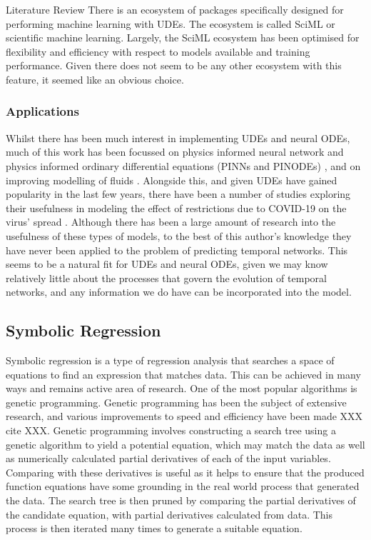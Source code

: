 \documentclass[12pt]{amsart}
\begin{document}
\begin{section}{Literature Review}
            There is an ecosystem of packages specifically designed for performing machine learning with UDEs. The ecosystem is called SciML or scientific machine learning\cite{SciML_C_Rak}. Largely, the SciML ecosystem has been optimised for flexibility and efficiency with respect to models available and training performance. Given there does not seem to be any other ecosystem with this feature, it seemed like 
            an obvious choice.
        
        \subsubsection{Applications}
            Whilst there has been much interest in implementing UDEs and neural ODEs, much of this work has been focussed on physics informed neural network and physics informed ordinary differential equations (PINNs and PINODEs) \cite{karniadakis2021physics,GAO2021110079,krishnapriyan2021characterizing,roehrl2020modeling}, and on improving modelling of fluids \cite{mahmoudabadbozchelou2021data,nguyen2022physics}. Alongside this, and given UDEs have gained popularity in the last few years, there have been a number of studies exploring their usefulness in modeling the effect of restrictions due to COVID-19 on the virus' spread \cite{Dandekar2020.04.03.20052084}. Although there has been a large amount of research into the usefulness of these types of models, to the best of this author's knowledge they have never been applied to the problem of predicting temporal networks. This seems to be a natural fit for UDEs and neural ODEs, given we may know relatively little about the processes that govern the evolution of temporal networks, and any information we do have can be incorporated into the model.

    \subsection{Symbolic Regression}
        Symbolic regression is a type of regression analysis that searches a space of equations to find an expression that matches data. This can be achieved in many ways and remains active area of research. One of the most popular algorithms is genetic programming\cite{schmidt2009distilling}. Genetic programming has been the subject of extensive research, and various improvements to speed and efficiency have been made XXX cite XXX. Genetic programming involves constructing a search tree using a genetic algorithm to yield a potential equation, which may match the data as well as numerically calculated partial derivatives of each of the input variables. Comparing with these derivatives is useful as it helps to ensure that the produced function equations have some grounding in the real world process that generated the data. The search tree is then pruned by comparing the partial derivatives of the candidate equation, with partial derivatives calculated from data. This process is then iterated many times to generate a suitable equation.


\end{section}
\end{document}
